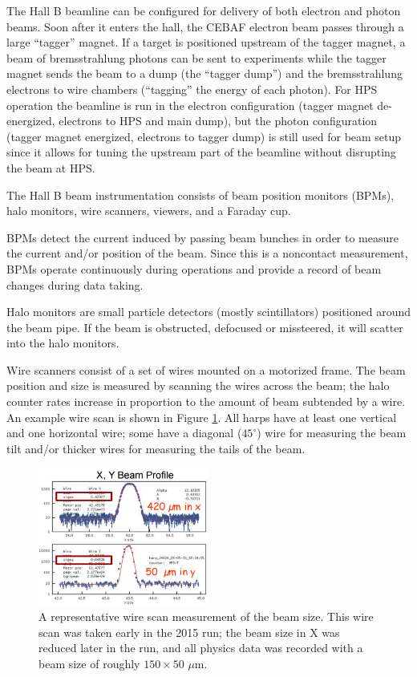 The Hall B beamline can be configured for delivery of both electron and photon beams.
Soon after it enters the hall, the CEBAF electron beam passes through a large ``tagger'' magnet.
If a target is positioned upstream of the tagger magnet, a beam of bremsstrahlung photons can be sent to experiments while the tagger magnet sends the beam to a dump (the ``tagger dump'') and the bremsstrahlung electrons to wire chambers (``tagging'' the energy of each photon).
For HPS operation the beamline is run in the electron configuration (tagger magnet de-energized, electrons to HPS and main dump), but the photon configuration (tagger magnet energized, electrons to tagger dump) is still used for beam setup since it allows for tuning the upstream part of the beamline without disrupting the beam at HPS.

The Hall B beam instrumentation consists of beam position monitors (BPMs), halo monitors, wire scanners, viewers, and a Faraday cup.

BPMs detect the current induced by passing beam bunches in order to measure the current and/or position of the beam.
Since this is a noncontact measurement, BPMs operate continuously during operations and provide a record of beam changes during data taking.

Halo monitors are small particle detectors (mostly scintillators) positioned around the beam pipe.
If the beam is obstructed, defocused or missteered, it will scatter into the halo monitors.

Wire scanners consist of a set of wires mounted on a motorized frame.
The beam position and size is measured by scanning the wires across the beam; the halo counter rates increase in proportion to the amount of beam subtended by a wire.
An example wire scan is shown in Figure \ref{fig:beamsize}.
All harps have at least one vertical and one horizontal wire; some have a diagonal ($45^\circ$) wire for measuring the beam tilt and/or thicker wires for measuring the tails of the beam.

\begin{figure}[htp]
    \begin{center}
        \includegraphics[width=0.5\textwidth]{detector/figs/beamsize}
    \end{center}
    \caption{A representative wire scan measurement of the beam size.
    This wire scan was taken early in the 2015 run; the beam size in X was reduced later in the run, and all physics data was recorded with a beam size of roughly $150\times 50$ $\mu$m.
    }
    \label{fig:beamsize}
\end{figure}

